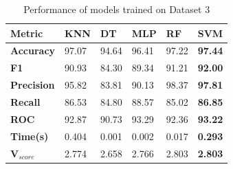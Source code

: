 \begin{table}[H]
  \centering
  \caption{Performance of models trained on Dataset 3}\label{tab:performance_of_models_trained_on_dataset_3}
  \begin{tabular}{|p{5em}|C{3em}|C{3em}|C{3em}|C{3em}|C{3em}|}
    \hline
    \textbf{Metric}      & \textbf{KNN} & \textbf{DT} & \textbf{MLP} & \textbf{RF} & \textbf{SVM}   \\
    \hline
    \textbf{Accuracy}    & 97.07        & 94.64       & 96.41        & 97.22       & \textbf{97.44} \\
    \textbf{F1}          & 90.93        & 84.30       & 89.34        & 91.21       & \textbf{92.00} \\
    \textbf{Precision}   & 95.82        & 83.81       & 90.13        & 98.37       & \textbf{97.81} \\
    \textbf{Recall}      & 86.53        & 84.80       & 88.57        & 85.02       & \textbf{86.85} \\
    \textbf{ROC}         & 92.87        & 90.73       & 93.29        & 92.36       & \textbf{93.22} \\
    \textbf{Time(s)}     & 0.404        & 0.001       & 0.002        & 0.017       & \textbf{0.293} \\
    \textbf{V$_{score}$} & 2.774        & 2.658       & 2.766        & 2.803       & \textbf{2.803} \\
    \hline
  \end{tabular}
\end{table}

